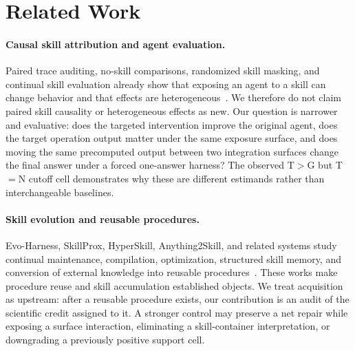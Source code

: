 \section{Related Work}
\label{sec:related}
\paragraph{Causal skill attribution and agent evaluation.}
Paired trace auditing, no-skill comparisons, randomized skill masking, and continual skill evaluation already show that exposing an agent to a skill can change behavior and that effects are heterogeneous~\citep{zhou2026counterfactual,dong2026agentskills,wang2026notallskills,guan2026continualskillbench}. We therefore do not claim paired skill causality or heterogeneous effects as new. Our question is narrower and evaluative: does the targeted intervention improve the original agent, does the target operation output matter under the same exposure surface, and does moving the same precomputed output between two integration surfaces change the final answer under a forced one-answer harness? The observed T$>$G but T$=$N cutoff cell demonstrates why these are different estimands rather than interchangeable baselines.

\paragraph{Skill evolution and reusable procedures.}
Evo-Harness, SkillProx, HyperSkill, Anything2Skill, and related systems study continual maintenance, compilation, optimization, structured skill memory, and conversion of external knowledge into reusable procedures~\citep{wei2026evoharness,zheng2026skillprox,xu2026hyperskill,pan2026anything2skill}. These works make procedure reuse and skill accumulation established objects. We treat acquisition as upstream: after a reusable procedure exists, our contribution is an audit of the scientific credit assigned to it. A stronger control may preserve a net repair while exposing a surface interaction, eliminating a skill-container interpretation, or downgrading a previously positive support cell.

